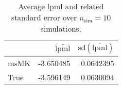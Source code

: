 \begin{table}[H]

\caption{Average lpml and related standard error over $n_{\text{sim}} = 10$ simulations.}
\centering
\begin{tabular}[t]{lrr}
\toprule
  & $\overbar{\text{lpml}}$ & $\text{sd}(\overbar{\text{lpml}})$\\
\midrule
msMK & -3.650485 & 0.0642395\\
True & -3.596149 & 0.0630094\\
\bottomrule
\end{tabular}
\end{table}